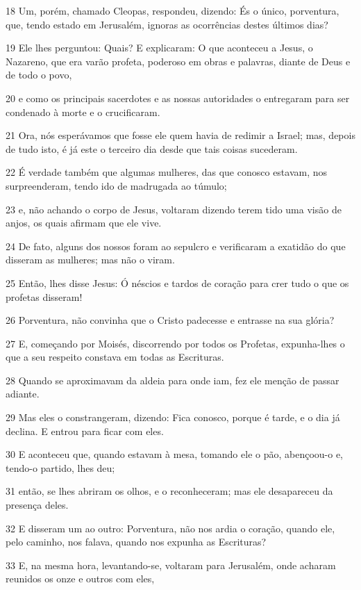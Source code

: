 \par 18 Um, porém, chamado Cleopas, respondeu, dizendo: És o único, porventura, que, tendo estado em Jerusalém, ignoras as ocorrências destes últimos dias?
\par 19 Ele lhes perguntou: Quais? E explicaram: O que aconteceu a Jesus, o Nazareno, que era varão profeta, poderoso em obras e palavras, diante de Deus e de todo o povo,
\par 20 e como os principais sacerdotes e as nossas autoridades o entregaram para ser condenado à morte e o crucificaram.
\par 21 Ora, nós esperávamos que fosse ele quem havia de redimir a Israel; mas, depois de tudo isto, é já este o terceiro dia desde que tais coisas sucederam.
\par 22 É verdade também que algumas mulheres, das que conosco estavam, nos surpreenderam, tendo ido de madrugada ao túmulo;
\par 23 e, não achando o corpo de Jesus, voltaram dizendo terem tido uma visão de anjos, os quais afirmam que ele vive.
\par 24 De fato, alguns dos nossos foram ao sepulcro e verificaram a exatidão do que disseram as mulheres; mas não o viram.
\par 25 Então, lhes disse Jesus: Ó néscios e tardos de coração para crer tudo o que os profetas disseram!
\par 26 Porventura, não convinha que o Cristo padecesse e entrasse na sua glória?
\par 27 E, começando por Moisés, discorrendo por todos os Profetas, expunha-lhes o que a seu respeito constava em todas as Escrituras.
\par 28 Quando se aproximavam da aldeia para onde iam, fez ele menção de passar adiante.
\par 29 Mas eles o constrangeram, dizendo: Fica conosco, porque é tarde, e o dia já declina. E entrou para ficar com eles.
\par 30 E aconteceu que, quando estavam à mesa, tomando ele o pão, abençoou-o e, tendo-o partido, lhes deu;
\par 31 então, se lhes abriram os olhos, e o reconheceram; mas ele desapareceu da presença deles.
\par 32 E disseram um ao outro: Porventura, não nos ardia o coração, quando ele, pelo caminho, nos falava, quando nos expunha as Escrituras?
\par 33 E, na mesma hora, levantando-se, voltaram para Jerusalém, onde acharam reunidos os onze e outros com eles,
